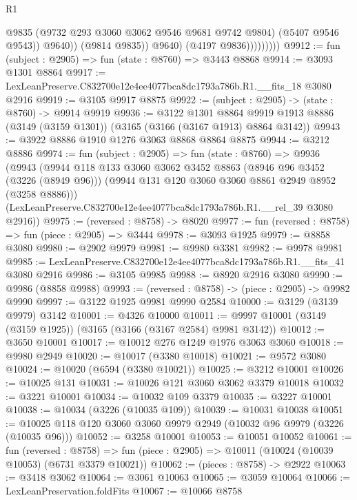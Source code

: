 \begin{lexlean}{R1}
\begin{coremodule}
                              @9835
                              (@9732 @293 @3060 @3062 @9546 @9681 @9742 @9804)
                              (@5407 @9546 @9543))
                            @9640))
                        (@9814 @9835))
                      @9640)
                    (@4197 @9836)))))))))
@9912 := fun (subject : @2905) => fun (state : @8760) => @3443 @8868
@9914 := @3093 @1301 @8864
@9917 := LexLeanPreserve.C832700e12e4ee4077bca8dc1793a786b.R1.__fits_18 @3080 @2916
@9919 := @3105 @9917 @8875
@9922 := (subject : @2905) -> (state : @8760) -> @9914 @9919
@9936 := @3122
    @1301
    @8864
    @9919
    @1913
    @8886
    (@3149 (@3159 @1301))
    (@3165 (@3166 (@3167 @1913) @8864 @3142))
@9943 := @3922 @8886 @1910 @1276 @3063 @8868 @8864 @8875
@9944 := @3212 @8886
@9974 := fun (subject : @2905) =>
  fun (state : @8760) =>
  @9936
    (@9943
      (@9944
        @118
        @133
        @3060
        @3062
        @3452
        @8863
        (@8946 @96 @3452 (@3226 (@8949 @96)))
        (@9944 @131 @120 @3060 @3060 @8861 @2949 @8952 (@3258 @8886)))
      (LexLeanPreserve.C832700e12e4ee4077bca8dc1793a786b.R1.__rel_39 @3080 @2916))
@9975 := (reversed : @8758) -> @8020
@9977 := fun (reversed : @8758) => fun (piece : @2905) => @3444
@9978 := @3093 @1925
@9979 := @8858 @3080
@9980 := @2902 @9979
@9981 := @9980 @3381
@9982 := @9978 @9981
@9985 := LexLeanPreserve.C832700e12e4ee4077bca8dc1793a786b.R1.__fits_41 @3080 @2916
@9986 := @3105 @9985
@9988 := @8920 @2916 @3080
@9990 := @9986 (@8858 @9988)
@9993 := (reversed : @8758) -> (piece : @2905) -> @9982 @9990
@9997 := @3122 @1925 @9981 @9990 @2584
@10000 := @3129 (@3139 @9979) @3142
@10001 := @4326 @10000
@10011 := @9997 @10001 (@3149 (@3159 @1925)) (@3165 (@3166 (@3167 @2584) @9981 @3142))
@10012 := @3650 @10001
@10017 := @10012 @276 @1249 @1976 @3063 @3060
@10018 := @9980 @2949
@10020 := @10017 (@3380 @10018)
@10021 := @9572 @3080
@10024 := @10020 (@6594 (@3380 @10021))
@10025 := @3212 @10001
@10026 := @10025 @131
@10031 := @10026 @121 @3060 @3062 @3379 @10018
@10032 := @3221 @10001
@10034 := @10032 @109 @3379
@10035 := @3227 @10001
@10038 := @10034 (@3226 (@10035 @109))
@10039 := @10031 @10038
@10051 := @10025 @118 @120 @3060 @3060 @9979 @2949 (@10032 @96 @9979 (@3226 (@10035 @96)))
@10052 := @3258 @10001
@10053 := @10051 @10052
@10061 := fun (reversed : @8758) =>
  fun (piece : @2905) => @10011 (@10024 (@10039 @10053) (@6731 @3379 @10021))
@10062 := (pieces : @8758) -> @2922
@10063 := @3418 @3062
@10064 := @3061 @10063
@10065 := @3059 @10064
@10066 := LexLeanPreservation.foldFits
@10067 := @10066 @8758

\end{coremodule}
\end{lexlean}
